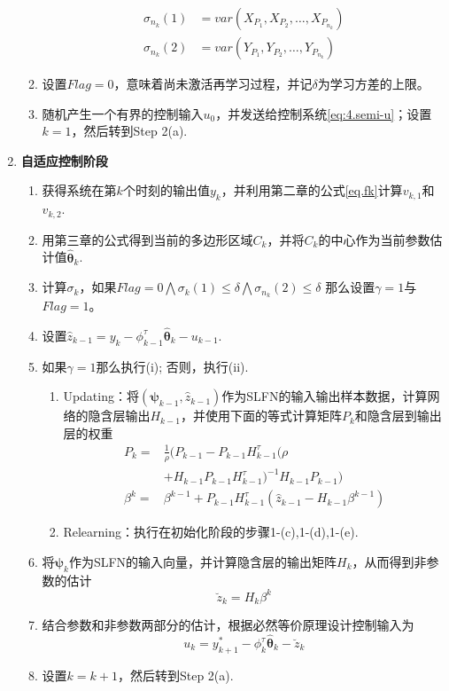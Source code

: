 \begin{enumerate}
\begin{enumerate}
\begin{equation}
\begin{split}%
\sigma_{n_{k}}(1) &= var(X_{P_{1}},X_{P_{2}},\ldots,X_{P_{n_{k}}}) \\
\sigma_{n_{k}}(2) &= var(Y_{P_{1}},Y_{P_{2}},\ldots,Y_{P_{n_{k}}})
\end{split}
\end{equation}
\item 设置$Flag=0$，意味着尚未激活再学习过程，并记$\delta$为学习方差的上限。
\item 随机产生一个有界的控制输入$u_{0}$，并发送给控制系统\eqref{eq:4.semi-u}；设置$k=1$，然后转到Step 2(a).
\end{enumerate}
\item \textbf{自适应控制阶段}
\begin{enumerate}%
\item 获得系统在第$k$个时刻的输出值$y_{k}$，并利用第二章的公式\eqref{eq.fk}计算$v_{k,1}$和$v_{k,2}$.
\item 用第三章的公式得到当前的多边形区域$C_{k}$，并将$C_{k}$的中心作为当前参数估计值$\hat{\bm{\theta}}_{k}$.
\item 计算$\sigma_{k}$，如果$Flag=0\bigwedge\sigma_{k}(1)\leq\delta\bigwedge\sigma_{n_{k}}(2)\leq\delta$ 那么设置$\gamma=1$与$Flag=1$。
\item 设置$\hat{z}_{k-1}=y_{k}-\phi_{k-1}^{\tau}\hat{\bm{\theta}}_{k}-u_{k-1}$.
\item 如果$\gamma=1$那么执行(i); 否则，执行(ii).
\begin{enumerate}%
\item Updating：将$(\bm{\psi}_{k-1},\hat{z}_{k-1})$作为SLFN的输入输出样本数据，计算网络的隐含层输出$H_{k-1}$，并使用下面的等式计算矩阵$P_{k}$和隐含层到输出层的权重
\begin{equation}\label{eq.elmk}
\begin{split}%
P_{k}=&\frac{1}{\rho}(P_{k-1}-P_{k-1}H_{k-1}^{\tau}(\rho\\
&+H_{k-1}P_{k-1}H_{k-1}^{\tau})^{-1}H_{k-1}P_{k-1}) \\
\beta^{k}=&\beta^{k-1} + P_{k-1}H_{k-1}^{\tau}(\hat{z}_{k-1}-H_{k-1}\beta^{k-1})
\end{split}
\end{equation}
\item Relearning：执行在初始化阶段的步骤1-(c),1-(d),1-(e).
\end{enumerate}
\item 将$\bm{\psi}_{k}$作为SLFN的输入向量，并计算隐含层的输出矩阵$H_{k}$，从而得到非参数的估计
\begin{equation}\label{eq.hat.z.k}
\breve{z}_{k}=H_{k}\beta^{k}
\end{equation}
\item 结合参数和非参数两部分的估计，根据必然等价原理设计控制输入为
\begin{equation}\label{eq.4:u}
u_{k}=y^{*}_{k+1}-\phi_{k}^{\tau}\hat{\bm{\theta}}_{k}-\breve{z}_{k}
\end{equation}
\item 设置$k=k+1$，然后转到Step 2(a).
\end{enumerate}
\end{enumerate}

